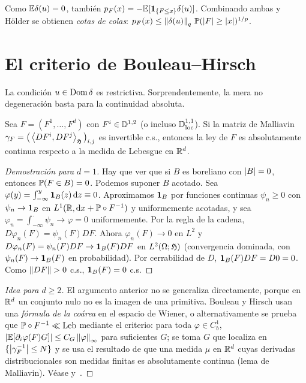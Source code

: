 \begin{observacion}
Como $\E\delta(u)=0$, también $p_F(x)=-\E[\ind_{\{F\le x\}}\delta(u)]$. Combinando ambas y
Hölder se obtienen \emph{cotas de colas}: $p_F(x)\le\norm{\delta(u)}_q\,\P(\abs{F}\ge\abs{x})^{1/p}$.
\end{observacion}

\section{El criterio de Bouleau--Hirsch}
La condición $u\in\Dom\delta$ es restrictiva. Sorprendentemente, la mera no degeneración basta para
la continuidad absoluta.

\begin{teorema}\label{teo:bouleau-hirsch}
Sea $F=(F^1,\dots,F^d)$ con $F^i\in\D^{1,2}$ (o incluso $\D^{1,1}_{\mathrm{loc}}$). Si
la matriz de Malliavin $\gamma_F=\big(\ip{DF^i}{DF^j}_\Hf\big)_{i,j}$ es invertible c.s., entonces la ley de $F$ es
absolutamente continua respecto a la medida de Lebesgue en $\R^d$.
\end{teorema}

\begin{proof}[Demostración para $d=1$]
Hay que ver que si $B$ es boreliano con $\abs{B}=0$, entonces $\P(F\in B)=
0$. Podemos suponer $B$ acotado. Sea $\varphi(y)=\int_{-\infty}^y\ind_B(z)\,\dd z\equiv0$. Aproximamos $\ind_B$ por funciones
continuas $\psi_n\ge0$ con $\psi_n\to\ind_B$ en $L^1(\R,\dd x+\P\circ F^{-1})$ y uniformemente acotadas, y sea
$\varphi_n=\int_{-\infty}^\cdot\psi_n\to\varphi=0$ uniformemente. Por la regla de la cadena, $D\varphi_n(F)=\psi_n(F)DF$. Ahora
$\varphi_n(F)\to0$ en $L^2$ y $D\varphi_n(F)=\psi_n(F)DF\to\ind_B(F)DF$ en $L^2(\Omega;\Hf)$ (convergencia dominada,
con $\psi_n(F)\to\ind_B(F)$ en probabilidad). Por cerrabilidad de $D$, $\ind_B(F)DF=D0=0$. Como
$\norm{DF}>0$ c.s., $\ind_B(F)=0$ c.s.
\end{proof}

\begin{proof}[Idea para $d\ge2$]
El argumento anterior no se generaliza directamente, porque en $\R^d$ un conjunto
nulo no es la imagen de una primitiva. Bouleau y Hirsch usan una \emph{fórmula de la coárea} en
el espacio de Wiener, o alternativamente se prueba que $\P\circ F^{-1}\ll\mathrm{Leb}$ mediante el criterio:
para toda $\varphi\in C_b^1$, $\abs{\E[\partial_i\varphi(F)G]}\le C_G\norm{\varphi}_\infty$ para suficientes $G$; se toma $G$ que localiza en
$\{\abs{\gamma_F^{-1}}\le N\}$ y se usa el resultado de que una medida $\mu$ en $\R^d$ cuyas derivadas distribucionales
son medidas finitas es absolutamente continua (lema de Malliavin). Véase \cite[§2.1]{Nualart06} y~\cite{BouleauHirsch91}.
\end{proof}

